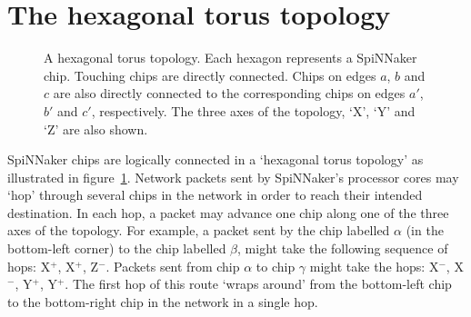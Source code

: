 	\section{The hexagonal torus topology}
		
		\begin{figure}
			\center
			
			\caption{A hexagonal torus topology. Each hexagon represents a
			SpiNNaker chip. Touching chips are directly connected. Chips on edges
			$a$, $b$ and $c$ are also directly connected to the corresponding chips
			on edges $a'$, $b'$ and $c'$, respectively. The three axes of the
			topology, `X', `Y' and `Z' are also shown.}
			\label{fig:hexagonalTorusTopology}
		\end{figure}
		
		SpiNNaker chips are logically connected in a `hexagonal torus topology'
		as illustrated in figure~\ref{fig:hexagonalTorusTopology}. Network
		packets sent by SpiNNaker's processor cores may `hop' through several
		chips in the network in order to reach their intended destination. In
		each hop, a packet may advance one chip along one of the three axes of
		the topology. For example, a packet sent by the chip labelled $\alpha$
		(in the bottom-left corner) to the chip labelled $\beta$, might take the
		following sequence of hops: X$^+$, X$^+$, Z$^-$. Packets sent from chip
		$\alpha$ to chip $\gamma$ might take the hops: X$^-$, X$^-$, Y$^+$,
		Y$^+$. The first hop of this route `wraps around' from the bottom-left
		chip to the bottom-right chip in the network in a single hop.
		
